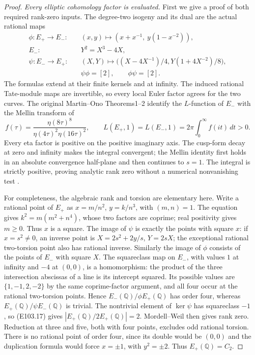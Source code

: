 \begin{proof}
\emph{Every elliptic cohomology factor is evaluated.}
First we give a proof of both required rank-zero inputs.
The degree-two isogeny and its dual are the actual rational maps
\[
 \begin{split}
 \phi:E_+\longrightarrow E_-:\quad
   &(x,y)\longmapsto(x+x^{-1},\ y(1-x^{-2})),\\
 E_-:\quad &Y^2=X^3-4X,\\
 \psi:E_-\longrightarrow E_+:\quad
   &(X,Y)\longmapsto\bigl((X-4X^{-1})/4,
                         Y(1+4X^{-2})/8\bigr),\\
 &\psi\phi=[2],\qquad\phi\psi=[2].
 \end{split}
 \tag{E103.17}
\]
The formulas extend at their finite kernels and at infinity.
The induced rational Tate-module maps are invertible, so every
local Euler factor agrees for the two curves.  The original Martin--Ono Theorems1--2 identify the $L$-function
of $E_-$ with the Mellin transform of
\[
 f(\tau)=\frac{\eta(8\tau)^8}{\eta(4\tau)^2\eta(16\tau)^2},
 \qquad
 L(E_+,1)=L(E_-,1)=2\pi\int_0^\infty f(it)\,dt>0.
 \tag{E103.18}
\]
Every eta factor is positive on the positive imaginary axis.
The cusp-form decay at zero and infinity makes the integral
convergent; the Mellin identity first holds in an absolute
convergence half-plane and then continues to $s=1$.
The integral is strictly positive, proving analytic rank zero
without a numerical nonvanishing test
\cite[Theorems1--2, tables and proof, pp.2--5 of the opened author PDF]{E103_MartinOno}.

For completeness, the algebraic rank and torsion are elementary
here.  Write a rational point of $E_+$ as
$x=m/n^2$, $y=k/n^3$, with $(m,n)=1$.
The equation gives $k^2=m(m^2+n^4)$, whose two factors are
coprime; real positivity gives $m\ge0$.  Thus $x$ is a square.
The image of $\psi$ is exactly the points with square $x$:
if $x=s^2\ne0$, an inverse point is
$X=2s^2+2y/s$, $Y=2sX$; the exceptional rational two-torsion
point also has rational inverse.  Similarly the image of
$\phi$ consists of the points of $E_-$ with square $X$.
The squareclass map on $E_-$, with values $1$ at infinity
and $-4$ at $(0,0)$, is a homomorphism: the product of the
three intersection abscissas of a line is its intercept squared.
Its possible values are $\{1,-1,2,-2\}$ by the same
coprime-factor argument, and all four occur at the rational
two-torsion points.  Hence $E_-(\mathbb Q)/\phi E_+(\mathbb Q)$
has order four, whereas $E_+(\mathbb Q)/\psi E_-(\mathbb Q)$
is trivial.  The nontrivial element of $\ker\psi$ has squareclass
$-1$, so (E103.17) gives $|E_+(\mathbb Q)/2E_+(\mathbb Q)|=2$.
Mordell--Weil then gives rank zero.  Reduction at three and five,
both with four points, excludes odd rational torsion.
There is no rational point of order four, since its double would
be $(0,0)$ and the duplication formula would force $x=\pm1$,
with $y^2=\pm2$.  Thus $E_+(\mathbb Q)=C_2$.


\end{proof}
